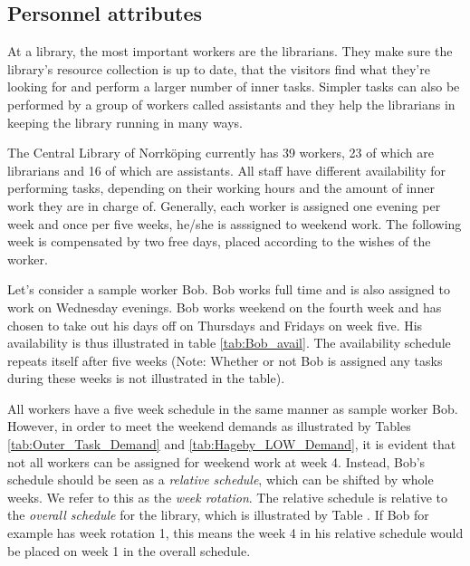 \subsection{Personnel attributes}

At a library, the most important workers are the librarians. They make sure the library's resource collection is up to date, that the visitors find what they're looking for and perform a larger number of inner tasks. Simpler tasks can also be performed by a group of workers called assistants and they help the librarians in keeping the library running in many ways.

The Central Library of Norrköping currently has 39 workers, 23 of which are librarians and 16 of which are assistants. All staff have different availability for performing tasks, depending on their working hours and the amount of inner work they are in charge of. Generally, each worker is assigned one evening per week and once per five weeks, he/she is asssigned to weekend work. The following week is compensated by two free days, placed according to the wishes of the worker.

Let's consider a sample worker Bob. Bob works full time and is also assigned to work on Wednesday evenings. Bob works weekend on the fourth week and has chosen to take out his days off on Thursdays and Fridays on week five. His availability is thus illustrated in table \ref{tab:Bob_avail}. The availability schedule repeats itself after five weeks (Note: Whether or not Bob is assigned any tasks during these weeks is not illustrated in the table).

All workers have a five week schedule in the same manner as sample worker Bob. However, in order to meet the weekend demands as illustrated by Tables \ref{tab:Outer_Task_Demand} and \ref{tab:Hageby_LOW_Demand}, it is evident that not all workers can be assigned for weekend work at week 4. Instead, Bob's schedule should be seen as a \textit{relative schedule}, which can be shifted by whole weeks. We refer to this as the \textit{week rotation}. The relative schedule is relative to the \textit{overall schedule} for the library, which is illustrated by Table . If Bob for example has week rotation 1, this means the week 4 in his relative schedule would be placed on week 1 in the overall schedule.



